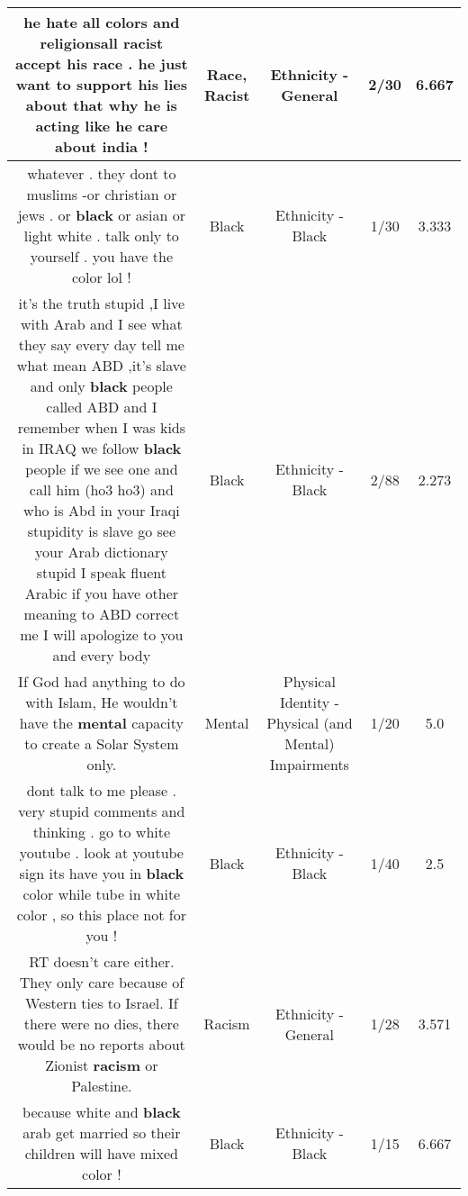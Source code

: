 \documentclass[11pt]{article}
\newlength\mylength
\begin{document}
\begin{center}
\begin{longtable}{|C{.65\mylength}|C{.30\mylength}|C{.12\mylength}|C{.12\mylength}|C{.12\mylength}|}
  \small he hate all colors and religionsall \textbf{racist} accept his \textbf{race}  . he just want to support his  lies about that  why he is acting like he care about india !\normalsize   & Race, Racist & Ethnicity - General & 2/30 & 6.667 \\  \hline
  \small whatever . they dont to muslims -or christian or jews . or \textbf{black} or asian or light white . talk only to yourself . you have the color lol  !\normalsize   & Black & Ethnicity - Black & 1/30 & 3.333 \\  \hline
  \small it's the truth stupid ,I live with Arab and I see what they say every day tell me what mean ABD ,it's slave and only \textbf{black} people called ABD and I remember when I was kids in IRAQ we follow \textbf{black} people if we see one and call him (ho3 ho3) and who is Abd in your Iraqi stupidity is slave go see your Arab dictionary stupid I speak fluent Arabic if you have other meaning to ABD correct me I will apologize to you and every body\normalsize   & Black & Ethnicity - Black & 2/88 & 2.273 \\  \hline
  \small If God had anything to do with Islam, He wouldn't have the \textbf{mental} capacity to create a Solar System only.\normalsize   & Mental & Physical Identity - Physical (and Mental) Impairments & 1/20 & 5.0 \\  \hline
  \small dont talk to me please . very stupid comments and thinking . go to white youtube  . look at youtube sign its have you in \textbf{black} color while tube in white color , so this place not for you !\normalsize   & Black & Ethnicity - Black & 1/40 & 2.5 \\  \hline
  \small RT doesn't care either. They only care because of Western ties to Israel. If there were no dies, there would be no reports about Zionist \textbf{racism} or Palestine.\normalsize   & Racism & Ethnicity - General & 1/28 & 3.571 \\  \hline
  \small because white and \textbf{black} arab get married so their children will have mixed color !\normalsize   & Black & Ethnicity - Black & 1/15 & 6.667 \\  \hline

\end{longtable}
\end{center}
\end{document}
